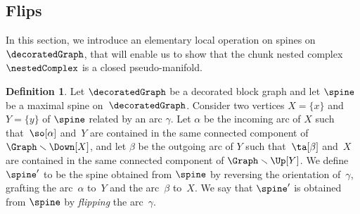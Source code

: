 \documentclass{amsart}
\theoremstyle{definition}
\newtheorem{definition}[theorem]{Definition}
\newcommand{\ssm}{\smallsetminus} %
\newcommand{\darkblue}{\color{darkblue}} %
\newcommand{\defn}[1]{\textsl{\darkblue #1}} %
\begin{document}

\subsection{Flips}
\label{subsec:flips}

In this section, we introduce an elementary local operation on spines on~$\decoratedGraph$, that will enable us to show that the chunk nested complex~$\nestedComplex$ is a closed pseudo-manifold.

\begin{definition}
  \label{def:flip}
  Let $\decoratedGraph$ be a decorated block graph and let $\spine$ be a maximal spine on~$\decoratedGraph$.
  Consider two vertices $X = \{x\}$ and $Y = \{y\}$ of $\spine$ related by an arc $\gamma$. 
  Let $\alpha$ be the incoming arc of $X$ such that~$\so[\alpha]$ and~$Y$ are contained in the same connected component of $\Graph \ssm \Down[X]$, and let $\beta$ be the outgoing arc of $Y$ such that~$\ta[\beta]$ and~$X$ are contained in the same connected component of $\Graph \ssm \Up[Y]$.
  We define $\spine'$ to be the spine obtained from $\spine$ by reversing the orientation of~$\gamma$, grafting the arc~$\alpha$ to~$Y$ and the arc~$\beta$ to~$X$.
  We say that $\spine'$ is obtained from $\spine$ by \defn{flipping} the arc~$\gamma$. 
\end{definition}
\end{document}
